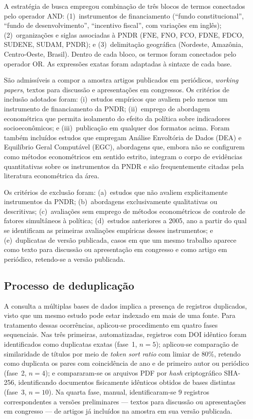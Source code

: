A estratégia de busca empregou combinação de três blocos de termos conectados pelo operador AND: (1)~instrumentos de financiamento (``fundo constitucional'', ``fundo de desenvolvimento'', ``incentivo fiscal'', com variações em inglês); (2)~organizações e siglas associadas à PNDR (FNE, FNO, FCO, FDNE, FDCO, SUDENE, SUDAM, PNDR); e (3)~delimitação geográfica (Nordeste, Amazônia, Centro-Oeste, Brasil). Dentro de cada bloco, os termos foram conectados pelo operador OR. As expressões exatas foram adaptadas à sintaxe de cada base.

São admissíveis a compor a amostra artigos publicados em periódicos, \textit{working papers}, textos para discussão e apresentações em congressos. Os critérios de inclusão adotados foram: (i)~estudos empíricos que avaliem pelo menos um instrumento de financiamento da PNDR; (ii)~emprego de abordagem econométrica que permita isolamento do efeito da política sobre indicadores socioeconômicos; e (iii)~publicação em qualquer dos formatos acima. Foram também incluídos estudos que empregam Análise Envoltória de Dados (DEA) e Equilíbrio Geral Computável (EGC), abordagens que, embora não se configurem como métodos econométricos em sentido estrito, integram o corpo de evidências quantitativas sobre os instrumentos da PNDR e são frequentemente citadas pela literatura econométrica da área.

Os critérios de exclusão foram: (a)~estudos que não avaliem explicitamente instrumentos da PNDR; (b)~abordagens exclusivamente qualitativas ou descritivas; (c)~avaliações sem emprego de métodos econométricos de controle de fatores simultâneos à política; (d)~estudos anteriores a 2005, ano a partir do qual se identificam as primeiras avaliações empíricas desses instrumentos; e (e)~duplicatas de versão publicada, casos em que um mesmo trabalho aparece como texto para discussão ou apresentação em congresso e como artigo em periódico, retendo-se a versão publicada.

\subsection{Processo de deduplicação}
\label{subsec:metodo-deduplicacao}

A consulta a múltiplas bases de dados implica a presença de registros duplicados, visto que um mesmo estudo pode estar indexado em mais de uma fonte. Para tratamento dessas ocorrências, aplicou-se procedimento em quatro fases sequenciais. Nas três primeiras, automatizadas, registros com DOI idêntico foram identificados como duplicatas exatas (fase~1, $n=5$); aplicou-se comparação de similaridade de títulos por meio de \textit{token sort ratio} com limiar de 80\%, retendo como duplicata os pares com coincidência de ano e de primeiro autor ou periódico (fase~2, $n=4$); e compararam-se os arquivos PDF por \textit{hash} criptográfico SHA-256, identificando documentos fisicamente idênticos obtidos de bases distintas (fase~3, $n=10$). Na quarta fase, manual, identificaram-se 9 registros correspondentes a versões preliminares --- textos para discussão ou apresentações em congresso --- de artigos já incluídos na amostra em sua versão publicada.

